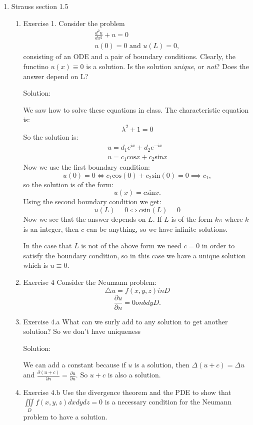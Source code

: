 \documentclass{article}
\begin{document}
\begin{enumerate}
\begin{enumerate}
		

	\end{enumerate}
\item Strauss section 1.5
	\begin{enumerate}
		\item Exercise 1. Consider the problem
		\begin{align*}
			\frac{d^2u}{dx^2}+u = 0 \\
			u(0)=0 \text{ and } u(L)=0,
		\end{align*}
		consisting of an ODE and a pair of boundary
		conditions. Clearly, the functino $u(x) \equiv 0$ is a
		solution. Is the solution \textit{unique}, or \textit{not}?
		Does the answer depend on L?

		Solution:

		We saw how to solve these equations in class.
		The characteristic equation is:
		\[
			\lambda^2 +1=0
		\]
		So the solution is:
		\begin{align*}
			u = d_1e^{ix} + d_2e^{-ix} \\
			u = c_1\text{cos}x +
			c_2\text{sin}x
		\end{align*}
		Now we use the first boundary condition:
		\[
			u(0)=0 \iff c_1\text{cos}(0) +
			c_2\text{sin}(0) = 0 \implies c_1,
	        \]
		so the solution is of the form:
		\[
			u(x)=c\text{sin}x.
		\]
		Using the second boundary condition we get:
		\[
			u(L)=0 \iff c\text{sin}(L) =0
		\]
		Now we see that the answer depends on $L$. If $L$ is of the form $k\pi$ where $k$ is an integer, then $c$ can be anything, so we have infinite solutions.

		In the case that $L$ is not of the above form we need $c=0$
		in order to satisfy the boundary condition, so in
		this case we have a unique solution which is $u
		\equiv 0$.
		
		\item Exercise 4 Consider the Neumann problem: \[\triangle u = f(x,y,z) in D\]
		\[\frac{\partial u}{\partial n}=0 on bdy D.\]
		\item  Exercise 4.a What can we surly add to any
		solution to get another solution? So we
		don't have uniqueness

		Solution:

		We can add a constant because if $u$ is a solution,
		then $\Delta(u+c)= \Delta u$ and $\frac{\partial
		(u+c)}{\partial n}=\frac{\partial u}{\partial n}$.
		So $u+c$ is also a solution.

		\item Exercise 4.b Use the divergence theorem and the PDE to show that $ \iiint\limits_{D}^{} f(x,y,z)dxdydz=0$ is a necessary condition for the Neumann problem to have a solution.
		

\end{enumerate}
\end{enumerate}
\end{document}
